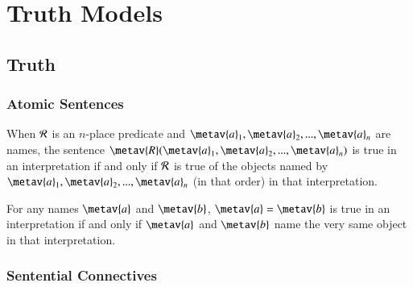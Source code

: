 %
%
%
\chapter{Truth Models}
\label{TMod} %

\section{ Truth}

\subsection{ Atomic Sentences}

\begin{definition}
    When $\mathcal{R}$ is an $n$-place predicate and $\metav{a}_1,\metav{a}_2,...,\metav{a}_n$ are names, the sentence $\metav{R}(\metav{a}_1,\metav{a}_2,...,\metav{a}_n)$ is true in an interpretation if and only if $\mathcal{R}$ is true of the objects named by $\metav{a}_1,\metav{a}_2,...,\metav{a}_n$ (in that order) in that interpretation.
\end{definition}


\begin{definition}
    For any names $\metav{a}$ and $\metav{b}$, $\metav{a} = \metav{b}$ is true in an interpretation if and only if $\metav{a}$ and $\metav{b}$ name the very same object in that interpretation.
\end{definition}

\subsection{ Sentential Connectives}

